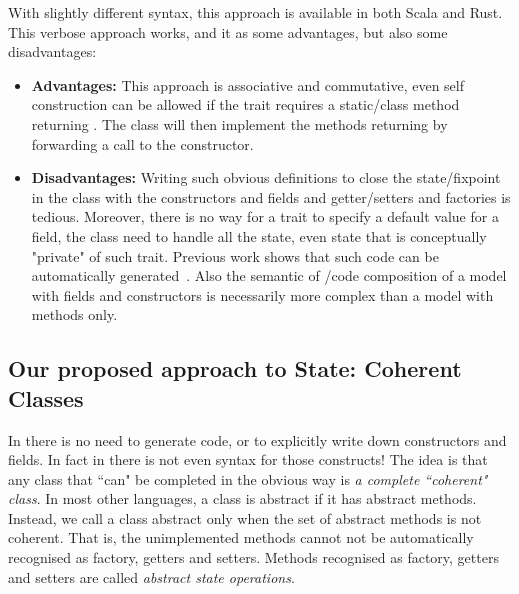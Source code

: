 \noindent 
With slightly different syntax, this approach is available in both Scala and Rust.
This verbose approach works, and it as some advantages, but also
some disadvantages: 

\begin{itemize}

\item {\bf Advantages:} This approach is associative and commutative, even self construction
  can be allowed if the trait requires a static/class method
  returning \Q@This@. The class will then implement the methods returning \Q@This@
  by forwarding a call to the constructor.
  
\item {\bf Disadvantages:} Writing such obvious definitions to close
  the state/fixpoint in the class 
   with the constructors and fields and getter/setters and factories is tedious.
   Moreover, there is no way for a trait to specify a default value for a field,
   the class need to handle all the state, even state that is conceptually
   "private" of such trait. 
   Previous work shows that such code can be automatically
   generated~\cite{wang2016classless}.
   Also the semantic of \Q@Use@/code composition of a model with fields and constructors is necessarily
   more complex than a model with methods only.
\end{itemize}

\subsection{Our proposed approach to State: Coherent Classes}

In \name there is no need to generate
code, or to explicitly write down constructors and fields. In fact in
\name there is not even syntax for those constructs!  The idea is that
any class that ``can" be completed in the obvious way  is \emph{a
  complete ``coherent" class}.  In most other languages, a class is
abstract if it has abstract methods.  Instead, we call a class
abstract only when the set of abstract methods is not coherent. That
is, the unimplemented methods cannot not be automatically recognised
as factory, getters and setters. Methods recognised as factory, getters and setters are called
\emph{abstract state operations}.
  
